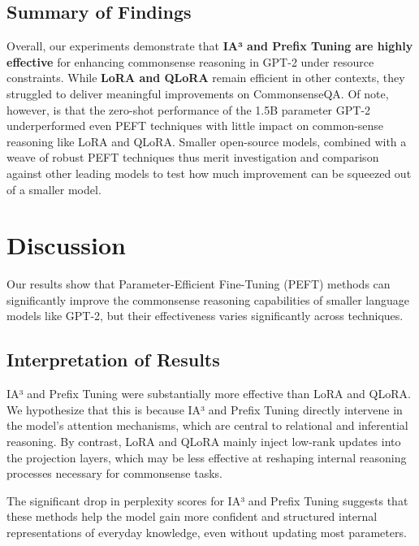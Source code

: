 \documentclass[11pt,twocolumn]{article}
\begin{document}
\subsection{Summary of Findings}

Overall, our experiments demonstrate that \textbf{IA³ and Prefix Tuning are highly effective} for enhancing commonsense reasoning in GPT-2 under resource constraints. While \textbf{LoRA and QLoRA} remain efficient in other contexts, they struggled to deliver meaningful improvements on CommonsenseQA. Of note, however, is that the zero-shot performance of the 1.5B parameter GPT-2 underperformed even PEFT techniques with little impact on common-sense reasoning like LoRA and QLoRA. Smaller open-source models, combined with a weave of robust PEFT techniques thus merit investigation and comparison against other leading models to test how much improvement can be squeezed out of a smaller model.

\section{Discussion}
\label{sec:discussion}
Our results show that Parameter-Efficient Fine-Tuning (PEFT) methods can significantly improve the commonsense reasoning capabilities of smaller language models like GPT-2, but their effectiveness varies significantly across techniques.

\subsection{Interpretation of Results}
IA³ and Prefix Tuning were substantially more effective than LoRA and QLoRA. We hypothesize that this is because IA³ and Prefix Tuning directly intervene in the model’s attention mechanisms, which are central to relational and inferential reasoning. By contrast, LoRA and QLoRA mainly inject low-rank updates into the projection layers, which may be less effective at reshaping internal reasoning processes necessary for commonsense tasks.

The significant drop in perplexity scores for IA³ and Prefix Tuning suggests that these methods help the model gain more confident and structured internal representations of everyday knowledge, even without updating most parameters.
\end{document}

